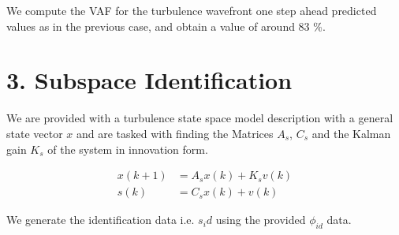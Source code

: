 \documentclass[12pt]{report}
\begin{document}
We compute the VAF for the turbulence wavefront one step ahead predicted values as in the previous case, and obtain a value of around 83 \%.

\section*{3. Subspace Identification}

We are provided with a turbulence state space model description with a general state vector $x$ and are tasked with finding the Matrices $A_s$, $C_s$ and the Kalman gain $K_s$ of the system in innovation form.

\begin{equation}
\begin{aligned}
x(k+1) &= A_s x(k) + K_s v(k)\\
s(k) &= C_s x(k) + v(k)
\end{aligned}
\end{equation}

We generate the identification data i.e. $s_id$ using the provided $\phi_{id}$ data.
\end{document}
